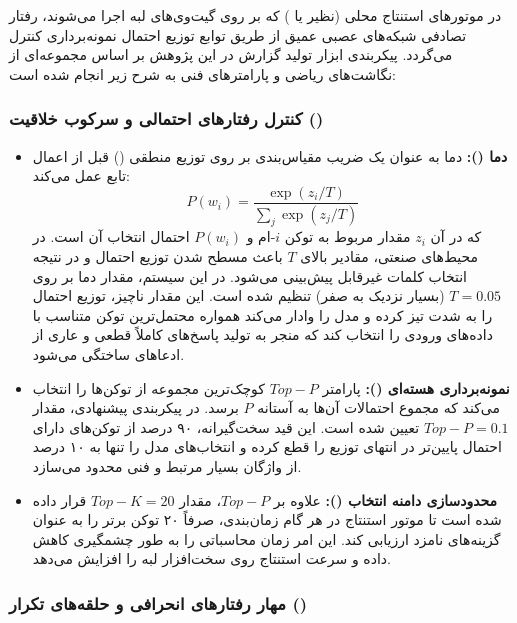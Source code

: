 \documentclass[a4paper, 10pt, twocolumn]{article}
\begin{document}
	در موتورهای استنتاج محلی (نظیر  یا ) که بر روی گیت‌وی‌های لبه اجرا می‌شوند، رفتار تصادفی شبکه‌های عصبی عمیق از طریق توابع توزیع احتمال نمونه‌برداری کنترل می‌گردد. پیکربندی ابزار تولید گزارش در این پژوهش بر اساس مجموعه‌ای از نگاشت‌های ریاضی و پارامترهای فنی به شرح زیر انجام شده است:
	
	\subsubsection{کنترل رفتارهای احتمالی و سرکوب خلاقیت ()}
	
	\begin{itemize}
		\item \textbf{دما ():} 
		دما به عنوان یک ضریب مقیاس‌بندی بر روی توزیع منطقی () قبل از اعمال تابع  عمل می‌کند:
		\begin{equation}
			P(w_i) = \frac{\exp(z_i / T)}{\sum_{j} \exp(z_j / T)}
		\end{equation}
		که در آن $z_i$ مقدار  مربوط به توکن $i$-ام و $P(w_i)$ احتمال انتخاب آن است. در محیط‌های صنعتی، مقادیر بالای $T$ باعث مسطح شدن توزیع احتمال و در نتیجه انتخاب کلمات غیرقابل پیش‌بینی می‌شود. در این سیستم، مقدار دما بر روی $T = 0.05$ (بسیار نزدیک به صفر) تنظیم شده است. این مقدار ناچیز، توزیع احتمال را به شدت تیز کرده و مدل را وادار می‌کند همواره محتمل‌ترین توکن متناسب با داده‌های ورودی را انتخاب کند که منجر به تولید پاسخ‌های کاملاً قطعی و عاری از ادعاهای ساختگی می‌شود.
		
		\item \textbf{نمونه‌برداری هسته‌ای ():}
		پارامتر $Top-P$ کوچک‌ترین مجموعه از توکن‌ها را انتخاب می‌کند که مجموع احتمالات آن‌ها به آستانه $P$ برسد. در پیکربندی پیشنهادی، مقدار $Top-P = 0.1$ تعیین شده است. این قید سخت‌گیرانه، ۹۰ درصد از توکن‌های دارای احتمال پایین‌تر در انتهای توزیع را قطع کرده و انتخاب‌های مدل را تنها به ۱۰ درصد از واژگان بسیار مرتبط و فنی محدود می‌سازد.
		
		\item \textbf{محدودسازی دامنه انتخاب ():}
		علاوه بر $Top-P$، مقدار $Top-K = 20$ قرار داده شده است تا موتور استنتاج در هر گام زمان‌بندی، صرفاً ۲۰ توکن برتر را به عنوان گزینه‌های نامزد ارزیابی کند. این امر زمان محاسباتی را به طور چشمگیری کاهش داده و سرعت استنتاج روی سخت‌افزار لبه را افزایش می‌دهد.
	\end{itemize}
	
	\subsubsection{مهار رفتارهای انحرافی و حلقه‌های تکرار ()}
	
\end{document}
